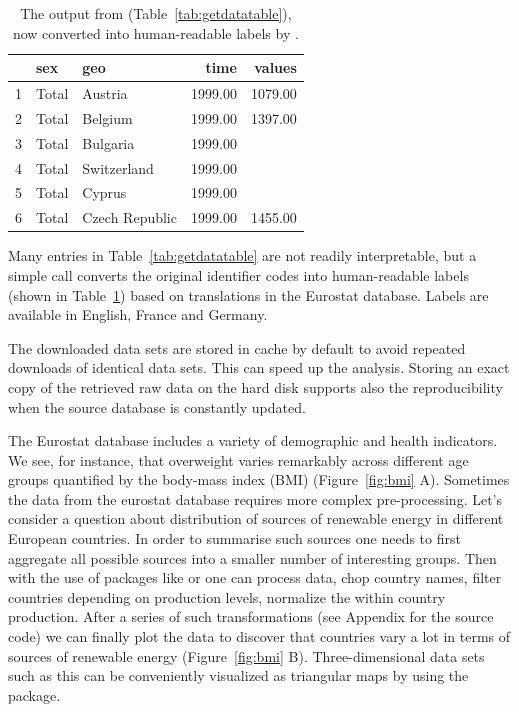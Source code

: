 \begin{table}[hb!]
\centering
\begin{tabular}{rllrr}
\toprule
  \hline
  & sex & geo & time & values \\ 
  \hline
  1 & Total & Austria & 1999.00 & 1079.00 \\ 
  2 & Total & Belgium & 1999.00 & 1397.00 \\ 
  3 & Total & Bulgaria & 1999.00 &  \\ 
  4 & Total & Switzerland & 1999.00 &  \\ 
  5 & Total & Cyprus & 1999.00 &  \\ 
  6 & Total & Czech Republic & 1999.00 & 1455.00 \\ 
   \hline
\bottomrule   
\end{tabular}
\caption{The output from  (Table~\ref{tab:getdatatable}), now converted into human-readable labels by .}
\label{tab:getdatatable2}
\end{table}

Many entries in Table~\ref{tab:getdatatable} are not readily
interpretable, but a simple call  converts
the original identifier codes into human-readable labels (shown in
Table~\ref{tab:getdatatable2}) based on translations in the Eurostat
database. Labels are available in English, France and Germany.

The downloaded data sets are stored in cache by default to avoid
repeated downloads of identical data sets. This can speed up the
analysis. Storing an exact copy of the retrieved raw data on the hard
disk supports also the reproducibility when the source database is
constantly updated.

The Eurostat database includes a variety of demographic and health
indicators. We see, for instance, that overweight varies remarkably
across different age groups quantified by the body-mass index (BMI)
(Figure~\ref{fig:bmi} A). Sometimes the data from the eurostat
database requires more complex pre-processing. Let's consider a
question about distribution of sources of renewable energy in
different European countries. In order to summarise such sources one
needs to first aggregate all possible sources into a smaller number of
interesting groups. Then with the use of packages like 
or  one can process data, chop country names, filter
countries depending on production levels, normalize the within country
production. After a series of such transformations (see Appendix for
the source code) we can finally plot the data to discover that
countries vary a lot in terms of sources of renewable energy
(Figure~\ref{fig:bmi} B). Three-dimensional data sets such as this can
be conveniently visualized as triangular maps by using
the  \citep{plotrix} package.


